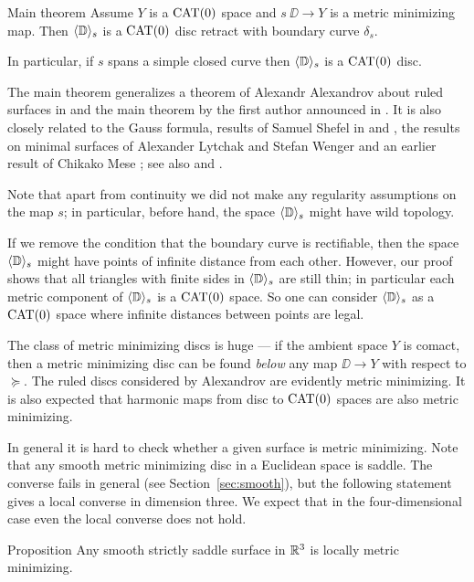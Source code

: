 \documentclass{article}
\begin{document}
\begin{thm}{Main theorem}
Assume $Y$ is a $\mathop{\rm CAT}\nolimits(0)$ space and $s\:\DD\to Y$ is a metric minimizing map.
Then $\langle\mathbb{D}\rangle_s$ is a $\mathop{\rm CAT}\nolimits(0)$ disc retract with boundary curve $\delta_s$.

In particular, if $s$ spans a simple closed curve then $\langle\mathbb{D}\rangle_s$ is a $\mathop{\rm CAT}\nolimits(0)$ disc.
\end{thm}

The main theorem generalizes a theorem of Alexandr Alexandrov about ruled surfaces in \cite{A} and the main theorem by the first author announced in \cite{petrunin-metric-min}.
It is also closely related to the Gauss formula, results of Samuel Shefel in \cite{shefel-2D} and \cite{shefel-3D}, the results on minimal surfaces of Alexander Lytchak and Stefan Wenger 
\cite[Theorem 1.2]{LW5}  and an earlier result of Chikako Mese \cite{mese};
see also \cite[Chapter 4]{akp} and \cite{petrunin-stadler}.

Note that apart from continuity we did not make any regularity assumptions on the map $s$;
in particular, before hand, the space $\langle\mathbb{D}\rangle_s$ might have wild topology.

If we remove the condition that the boundary curve is rectifiable, then the space $\langle\mathbb{D}\rangle_s$ might have points of infinite distance from each other.
However, our proof shows that all triangles with finite sides in $\langle\mathbb{D}\rangle_s$ are still thin; 
in particular each metric component of $\langle\mathbb{D}\rangle_s$ is a $\mathop{\rm CAT}\nolimits(0)$ space.
So one can consider $\langle\mathbb{D}\rangle_s$ as a $\mathop{\rm CAT}\nolimits(0)$ space where infinite distances between points are legal.

The class of metric minimizing discs is huge --- if the ambient space $Y$ is comact, then a metric minimizing  disc can be found \emph{below} any map $\DD\to Y$ with respect to $\succcurlyeq$.
The ruled discs considered by Alexandrov are evidently metric minimizing.
It is also expected that harmonic maps from disc to $\mathop{\rm CAT}\nolimits(0)$ spaces are also metric minimizing.

In general it is hard to check whether a given surface is metric minimizing.
Note that any smooth metric minimizing disc in a Euclidean space is saddle.
The converse fails in general (see Section~\ref{sec:smooth}), but the following statement gives a local converse in dimension three.
We expect that in the four-dimensional case even the local converse does not hold.

\begin{thm}{Proposition}\label{prop:smooth}
Any smooth strictly saddle surface in $\mathbb{R}^3$ is locally metric minimizing.
\end{thm}
 
\end{document}
